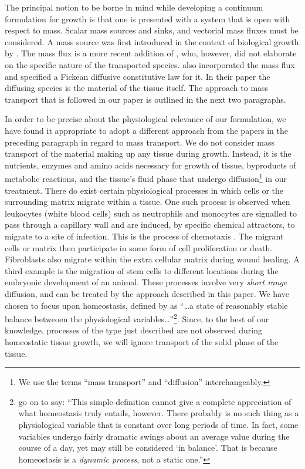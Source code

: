 The principal notion to be borne in mind while developing a
continuum formulation for growth is that one is presented with a
system that is open with respect to mass. Scalar mass sources and
sinks, and vectorial mass fluxes must be considered. A mass source
was first introduced in the context of biological growth by
\citet{CowinHegedus:76}. The mass flux is a more recent addition
of \citet{EpsteinMaugin:2000}, who, however, did not elaborate on
the specific nature of the transported species.
\citet{KuhlSteinmann:02} also incorporated the mass flux and
specified a Fickean diffusive constitutive law for it. In their
paper the diffusing species is the material of the tissue itself.
The approach to mass transport that is followed in our paper is
outlined in the next two paragraphs.

In order to be precise about the physiological relevance of our
formulation, we have found it appropriate to adopt a different
approach from the papers in the preceding paragraph in regard to
mass transport. We do not consider mass transport of the material
making up any tissue during growth. Instead, it is the nutrients,
enzymes and amino acids necessary for growth of tissue, byproducts
of metabolic reactions, and the tissue's fluid phase
\citep{Swartzetal:99} that undergo diffusion\footnote{We use the
terms ``mass transport'' and ``diffusion'' interchangeably.} in
our treatment. There do exist certain physiological processes in
which cells or the surrounding matrix migrate within a tissue. One
such process is observed when leukocytes (white blood cells) such
as neutrophils and monocytes are signalled to pass through a
capillary wall and are induced, by specific chemical attractors,
to migrate to a site of infection. This is the process of
chemotaxis \citep{GuytonHall:1996,Vander:2003}. The migrant cells
or matrix then participate in some form of cell proliferation or
death. Fibroblasts also migrate within the extra cellular matrix
during wound healing. A third example is the migration of stem
cells to different locations during the embryonic development of
an animal. These processes involve very \emph{short range}
diffusion, and can be treated by the approach described in this
paper. We have chosen to focus upon homeostasis, defined by
\citet{Vander:2003} as ``\dots a state of reasonably stable
balance betweoen the physiological
variables\dots''\footnote{\citet{Vander:2003} go on to say: ``This
simple definition cannot give a complete appreciation of what
homeostasis truly entails, however. There probably is no such
thing as a physiological variable that is constant over long
periods of time. In fact, some variables undergo fairly dramatic
swings about an average value during the course of a day, yet may
still be considered `in balance'. That is because homeostasis is a
\emph{dynamic process}, not a static one.''}. Since, to the best
of our knowledge, processes of the type just described are not
observed during homeostatic tissue growth, we will ignore
transport of the solid phase of the tissue.

